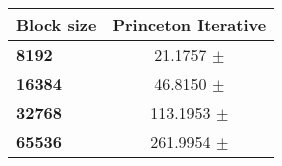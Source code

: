 \begin{tabular}{lc}\toprule
\textbf{Block size}  & \textbf{Princeton Iterative}\\\midrule
\textbf{8192}  & 21.1757 $\pm$ \\
\textbf{16384}  & 46.8150 $\pm$ \\
\textbf{32768}  & 113.1953 $\pm$ \\
\textbf{65536} & 261.9954 $\pm$ \\
\bottomrule
\end{tabular}
